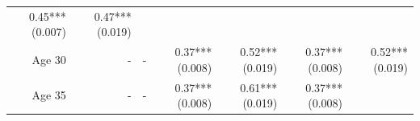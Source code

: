 \documentclass[]{article}
\begin{document}
\begin{longtable}[c]{@{}rrrrrrr@{}}
\begin{minipage}[t]{0.11\columnwidth}\raggedleft\strut
0.45*** (0.007)
\strut\end{minipage} &
\begin{minipage}[t]{0.11\columnwidth}\raggedleft\strut
0.47*** (0.019)
\strut\end{minipage}\tabularnewline
\begin{minipage}[t]{0.12\columnwidth}\raggedleft\strut
Age 30
\strut\end{minipage} &
\begin{minipage}[t]{0.11\columnwidth}\raggedleft\strut
-
\strut\end{minipage} &
\begin{minipage}[t]{0.12\columnwidth}\raggedleft\strut
-
\strut\end{minipage} &
\begin{minipage}[t]{0.11\columnwidth}\raggedleft\strut
0.37*** (0.008)
\strut\end{minipage} &
\begin{minipage}[t]{0.12\columnwidth}\raggedleft\strut
0.52*** (0.019)
\strut\end{minipage} &
\begin{minipage}[t]{0.11\columnwidth}\raggedleft\strut
0.37*** (0.008)
\strut\end{minipage} &
\begin{minipage}[t]{0.11\columnwidth}\raggedleft\strut
0.52*** (0.019)
\strut\end{minipage}\tabularnewline
\begin{minipage}[t]{0.12\columnwidth}\raggedleft\strut
Age 35
\strut\end{minipage} &
\begin{minipage}[t]{0.11\columnwidth}\raggedleft\strut
-
\strut\end{minipage} &
\begin{minipage}[t]{0.12\columnwidth}\raggedleft\strut
-
\strut\end{minipage} &
\begin{minipage}[t]{0.11\columnwidth}\raggedleft\strut
0.37*** (0.008)
\strut\end{minipage} &
\begin{minipage}[t]{0.12\columnwidth}\raggedleft\strut
0.61*** (0.019)
\strut\end{minipage} &
\begin{minipage}[t]{0.11\columnwidth}\raggedleft\strut
0.37*** (0.008)
\strut\end{minipage} &
\begin{minipage}[t]{0.11\columnwidth}\raggedleft\strut

\end{minipage}
\end{longtable}
\end{document}
